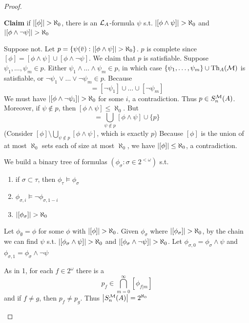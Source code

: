 \documentclass[11pt]{article}
\begin{document}
\begin{proof}
\begin{enumerate}
\textbf{Claim} if \(\abs{[\phi]}>\aleph_0\), there is an \(\mathcal{L}_A\)-formula \(\psi\) s.t. \(\abs{[\phi\wedge\psi]}>\aleph_0\)
and \(\abs{[\phi\wedge\neg\psi]}>\aleph_0\)

Suppose not. Let \(p=\{\psi(\barv):\abs{[\phi\wedge\psi]}>\aleph_0\}\). \(p\) is complete
since \([\phi]=[\phi\wedge\psi]\cup[\phi\wedge\neg\psi]\). We claim that \(p\) is satisfiable.
Suppose \(\psi_1,\dots,\psi_m\in p\). Either \(\psi_1\wedge\dots\wedge\psi_m\in p\), in which case \(\{\psi_1,\dots,\psi_m\}\cup\operatorname{Th}_A(\mathcal{M})\) is
satisfiable, or \(\neg\psi_1\vee\dots\vee\neg\psi_m\in p\). Because
\begin{equation*}
[\neg\psi_1\vee\dots\vee\neg\psi_m]=[\neg\psi_1]\cup\dots\cup[\neg\psi_m]
\end{equation*}
We must have \(\abs{[\phi\wedge\neg\psi_i]}>\aleph_0\) for some \(i\), a contradiction. Thus \(p\in S_n^{\mathcal{M}}(A)\).
Moreover, if \(\psi\not\in p\), then \([\phi\wedge\psi]\le\aleph_0\). But
\begin{equation*}
[\phi]=\bigcup_{\psi\not\in p}[\phi\wedge\psi]\cup\{p\}
\end{equation*}
(Consider \([\phi]\setminus\bigcup_{\psi\notin p}[\phi\wedge\psi]\), which is exactly \(p\))
Because \([\phi]\) is the union of at most \(\aleph_0\) sets each of size at most \(\aleph_0\), we
have \(\abs{[\phi]}\le\aleph_0\), a contradiction.

We build a binary tree of formulas \((\phi_\sigma:\sigma\in 2^{<\omega})\) s.t.
\begin{enumerate}
\item if \(\sigma\subset\tau\), then \(\phi_\tau\vDash\phi_\sigma\)
\item \(\phi_{\sigma,i}\vDash\neg\phi_{\sigma,1-i}\)
\item \(\abs{[\phi_\sigma]}>\aleph_0\)
\end{enumerate}
Let \(\phi_\emptyset=\phi\) for some \(\phi\) with \(\abs{[\phi]}>\aleph_0\). Given \(\phi_\sigma\) where \(\abs{[\phi_\sigma]}>\aleph_0\), by
the chain we can find \(\psi\) s.t. \(\abs{[\phi_\sigma\wedge\psi]}>\aleph_0\) and \(\abs{[\phi_\sigma\wedge\neg\psi]}>\aleph_0\).
Let \(\phi_{\sigma,0}=\phi_\sigma\wedge\psi\) and \(\phi_{\sigma,1}=\phi_\sigma\wedge\neg\psi\)

As in 1, for each \(f\in 2^\omega\) there is a
\begin{equation*}
p_f\in\bigcap_{m=0}^\infty[\phi_{f|m}]
\end{equation*}
and if \(f\neq g\), then \(p_f\neq p_g\). Thus \(\abs{S_n^{\calm}(A)}=2^{\aleph_0}\)
\end{enumerate}
\end{proof}
\end{document}

